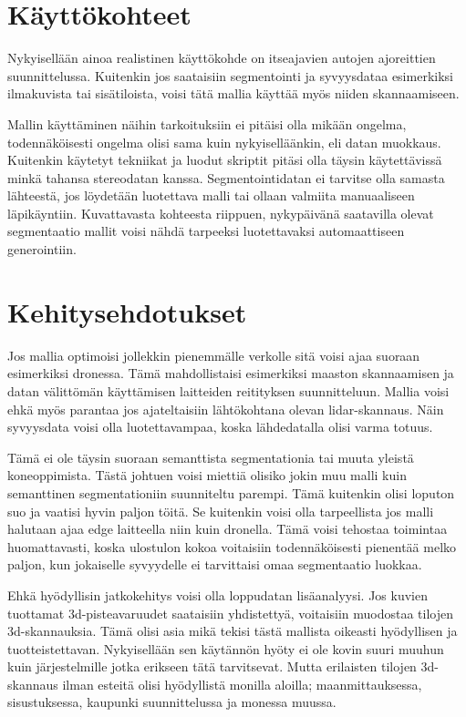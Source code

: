\section{Käyttökohteet}

Nykyisellään ainoa realistinen käyttökohde on itseajavien autojen ajoreittien suunnittelussa.
Kuitenkin jos saataisiin segmentointi ja syvyysdataa esimerkiksi ilmakuvista tai sisätiloista, voisi tätä mallia käyttää myös niiden skannaamiseen.

Mallin käyttäminen näihin tarkoituksiin ei pitäisi olla mikään ongelma, todennäköisesti ongelma olisi sama kuin nykyiselläänkin, eli datan muokkaus.
Kuitenkin käytetyt tekniikat ja luodut skriptit pitäsi olla täysin käytettävissä minkä tahansa stereodatan kanssa.
Segmentointidatan ei tarvitse olla samasta lähteestä, jos löydetään luotettava malli tai ollaan valmiita manuaaliseen läpikäyntiin.
Kuvattavasta kohteesta riippuen, nykypäivänä saatavilla olevat segmentaatio mallit voisi nähdä tarpeeksi luotettavaksi automaattiseen generointiin.

\section{Kehitysehdotukset}


Jos mallia optimoisi jollekkin pienemmälle verkolle sitä voisi ajaa suoraan esimerkiksi dronessa.
Tämä mahdollistaisi esimerkiksi maaston skannaamisen ja datan välittömän käyttämisen laitteiden reitityksen suunnitteluun.
Mallia voisi ehkä myös parantaa jos ajateltaisiin lähtökohtana olevan lidar-skannaus.
Näin syvyysdata voisi olla luotettavampaa, koska lähdedatalla olisi varma totuus. 

Tämä ei ole täysin suoraan semanttista segmentationia tai muuta yleistä koneoppimista.
Tästä johtuen voisi miettiä olisiko jokin muu malli kuin semanttinen segmentationiin suunniteltu parempi.
Tämä kuitenkin olisi loputon suo ja vaatisi hyvin paljon töitä.
Se kuitenkin voisi olla tarpeellista jos malli halutaan ajaa edge laitteella niin kuin dronella. 
Tämä voisi tehostaa toimintaa huomattavasti, koska ulostulon kokoa voitaisiin todennäköisesti pienentää melko paljon, kun jokaiselle syvyydelle ei tarvittaisi omaa segmentaatio luokkaa.

Ehkä hyödyllisin jatkokehitys voisi olla loppudatan lisäanalyysi.
Jos kuvien tuottamat 3d-pisteavaruudet saataisiin yhdistettyä, voitaisiin muodostaa tilojen 3d-skannauksia.
Tämä olisi asia mikä tekisi tästä mallista oikeasti hyödyllisen ja tuotteistettavan.
Nykyisellään sen käytännön hyöty ei ole kovin suuri muuhun kuin järjestelmille jotka erikseen tätä tarvitsevat.
Mutta erilaisten tilojen 3d-skannaus ilman esteitä olisi hyödyllistä monilla aloilla; maanmittauksessa, sisustuksessa, kaupunki suunnittelussa ja monessa muussa.

